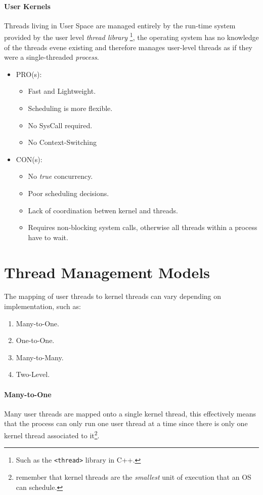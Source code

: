 \documentclass[openright, twoside]{report}
\theoremstyle{definition}
\theoremstyle{example}
\begin{document}
	\paragraph{User Kernels}
	Threads living in User Space are managed entirely by the run-time system provided 
	by the user level \emph{thread library} \footnote{Such as the \texttt{<thread>} library in C++.},
	the operating system has no knowledge of the threads evene existing and therefore manages 
	user-level threads as if they were a single-threaded \emph{process}.

	\begin{itemize}
		\item PRO(s):
		\begin{itemize}
			\item Fast and Lightweight.
			\item Scheduling is more flexible.
			\item No SysCall required.
			\item No Context-Switching
		\end{itemize}
		\item CON(s):
		\begin{itemize}
			\item No \emph{true} concurrency.
			\item Poor scheduling decisions.
			\item Lack of coordination betwen kernel and threads.
			\item Requires non-blocking system calls, otherwise all threads within a process 
			have to wait.
		\end{itemize}
	\end{itemize}

\section{Thread Management Models}
The mapping of user threads to kernel threads can vary depending on implementation, such as:
	\begin{enumerate}
		\item Many-to-One.
		\item One-to-One.
		\item Many-to-Many.
		\item Two-Level.
	\end{enumerate}

	\paragraph{Many-to-One}
	Many user threads are mapped onto a single kernel thread, this effectively means that 
	the process can only run one user thread at a time since there is only one kernel thread 
	associated to it\footnote{remember that kernel threads are the \emph{smallest} unit of 
	execution that an OS can schedule.}.
\end{document}
